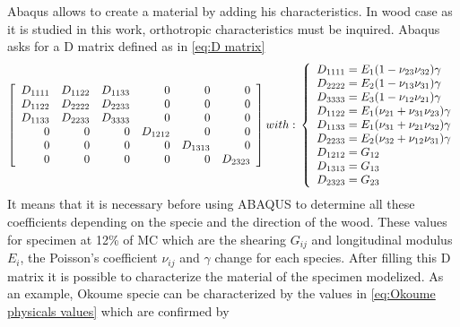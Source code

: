 Abaqus allows to create a material by adding his characteristics. In wood case as it is studied in this work, orthotropic characteristics must be inquired. Abaqus asks for a D matrix defined as in \ref{eq:D matrix}
\begin{equation}
	\left[
	\begin{array}{rrrrrr}
		D_{1111} & D_{1122} & D_{1133} &
		0 & 0 & 0 \\
		D_{1122} &
		D_{2222} &
		D_{2233} &
		0 & 0 & 0 \\
		D_{1133} &
		D_{2233} &
		D_{3333} &
		0 & 0 & 0 \\
		0 & 0 & 0 &
		D_{1212} & 0 & 0 \\
		0 & 0 & 0 & 0 &
		D_{1313} & 0 \\
		0 & 0 & 0 & 0 & 0 &
		D_{2323} \\
	\end{array}
	\right]
	with : \\
	\\
	\left\{
	\begin{array}{lllll}
		D_{1111}=E_{1}(1-\nu_{23}\nu_{32})\gamma \\
		D_{2222}=E_{2}(1-\nu_{13}\nu_{31})\gamma \\
		D_{3333}=E_{3}(1-\nu_{12}\nu_{21})\gamma \\
		D_{1122}=E_{1}(\nu_{21}+\nu_{31}\nu_{23})\gamma \\	D_{1133}=E_{1}(\nu_{31}+\nu_{21}\nu_{32})\gamma	 \\	D_{2233}=E_{2}(\nu_{32}+\nu_{12}\nu_{31})\gamma \\	D_{1212}=G_{12} \\	D_{1313}=G_{13} \\	D_{2323}=G_{23} \\
	\end{array}
	\right.
	\label{eq:D matrix}
\end{equation}
It means that it is necessary before using ABAQUS to determine all these coefficients depending on the specie and the direction of the wood. These values for specimen at 12\% of MC which are the shearing $G_{ij}$ and longitudinal modulus $E_{i}$, the Poisson's coefficient $\nu_{ij}$ and $\gamma$ change for each species. After filling this D matrix it is possible to characterize the material of the specimen modelized. As an example, Okoume specie can be characterized by the values in \ref{eq:Okoume physicals values} which are confirmed by \parencite{Reference5}
